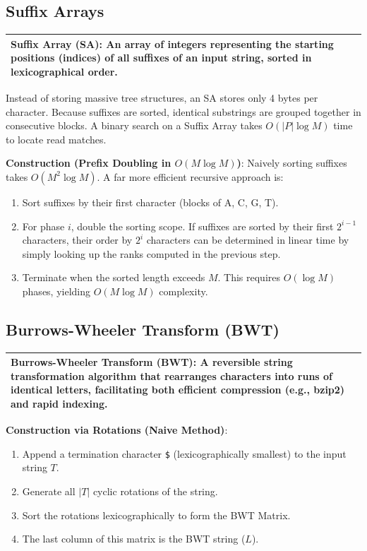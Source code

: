 \documentclass[11pt,a4paper]{article}
\newenvironment{important}
    {\vspace{1em}\noindent\begin{tabular}{|p{0.97\textwidth}|}\hline\vspace{0.1em}}
    {\vspace{0.1em}\\\hline\end{tabular}\vspace{1em}}
\begin{document}

\subsection{Suffix Arrays}

\begin{important}
\textbf{Suffix Array (SA)}: An array of integers representing the starting positions (indices) of all suffixes of an input string, sorted in lexicographical order.
\end{important}

Instead of storing massive tree structures, an SA stores only 4 bytes per character. 
Because suffixes are sorted, identical substrings are grouped together in consecutive blocks. A binary search on a Suffix Array takes $O(|P| \log M)$ time to locate read matches.

\textbf{Construction (Prefix Doubling in $O(M \log M)$)}:
Naively sorting suffixes takes $O(M^2 \log M)$. A far more efficient recursive approach is:
\begin{enumerate}
    \item Sort suffixes by their first character (blocks of A, C, G, T).
    \item For phase $i$, double the sorting scope. If suffixes are sorted by their first $2^{i-1}$ characters, their order by $2^i$ characters can be determined in linear time by simply looking up the ranks computed in the previous step.
    \item Terminate when the sorted length exceeds $M$. This requires $O(\log M)$ phases, yielding $O(M \log M)$ complexity.
\end{enumerate}

\subsection{Burrows-Wheeler Transform (BWT)}

\begin{important}
\textbf{Burrows-Wheeler Transform (BWT)}: A reversible string transformation algorithm that rearranges characters into runs of identical letters, facilitating both efficient compression (e.g., bzip2) and rapid indexing.
\end{important}

\textbf{Construction via Rotations (Naive Method)}:
\begin{enumerate}
    \item Append a termination character \texttt{\$} (lexicographically smallest) to the input string $T$.
    \item Generate all $|T|$ cyclic rotations of the string.
    \item Sort the rotations lexicographically to form the BWT Matrix.
    \item The last column of this matrix is the BWT string ($L$).
\end{enumerate}
\end{document}

